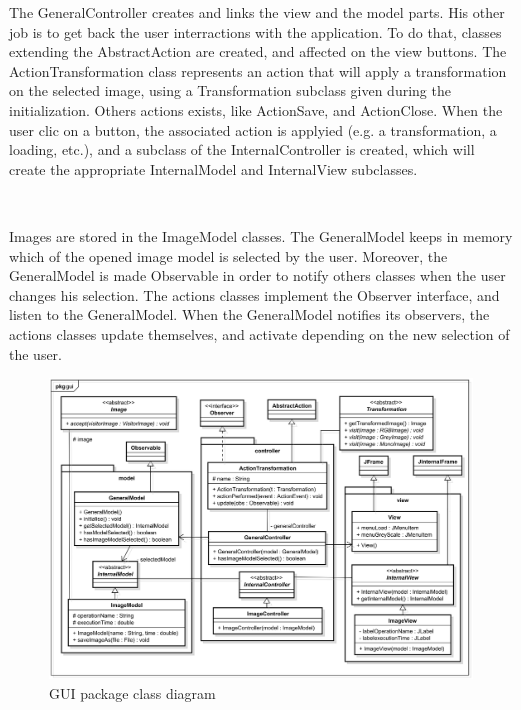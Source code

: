 The GeneralController creates and links the view and the model parts. His other job is to get back the user interractions with the application. To do that, classes extending the AbstractAction are created, and affected on the view buttons. The ActionTransformation class represents an action that will apply a transformation on the selected image, using a Transformation subclass given during the initialization. Others actions exists, like ActionSave, and ActionClose. When the user clic on a button, the associated action is applyied (e.g. a transformation, a loading, etc.), and a subclass of the InternalController is created, which will create the appropriate InternalModel and InternalView subclasses.

~~

Images are stored in the ImageModel classes. The GeneralModel keeps in memory which of the opened image model is selected by the user. Moreover, the GeneralModel is made Observable in order to notify others classes when the user changes his selection. The actions classes implement the Observer interface, and listen to the GeneralModel. When the GeneralModel notifies its observers, the actions classes update themselves, and activate depending on the new selection of the user. 



\begin{figure}[H]
	\centering
	\includegraphics[width=1\textwidth]{images/diagrams/class_diagram_gui}
	\caption{GUI package class diagram}
	\label{fig:diagram:class:gui}
\end{figure}







